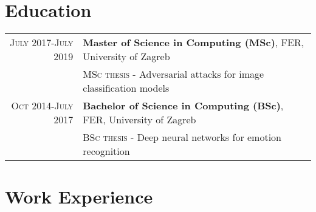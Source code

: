 \documentclass[a4paper,10pt]{article} %
\begin{document}
\section{Education}

\begin{tabular}{rl}
    \textsc{July} 2017-\textsc{July} 2019 & \textbf{Master of Science in Computing (MSc)}, \footnotesize{FER, University of Zagreb} \\
                                    & \footnotesize{\textsc{MSc thesis} - Adversarial attacks for image classification models} \\
    \textsc{Oct} 2014-\textsc{July} 2017 & \textbf{Bachelor of Science in Computing (BSc)}, \footnotesize{FER, University of Zagreb}  \\
                                    & \footnotesize{\textsc{BSc thesis} - Deep neural networks for emotion recognition} \\
\end{tabular}
\vspace{3mm}
\section{Work Experience}
\end{document}
